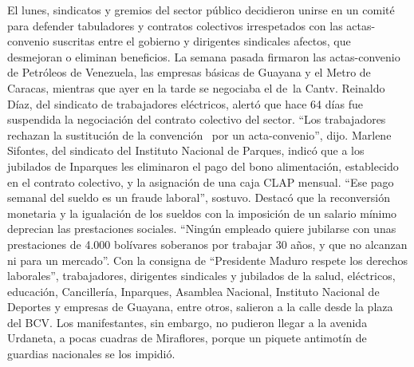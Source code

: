 \documentclass{article}%
\begin{document}
\newline%
%
El lunes, sindicatos y gremios del sector público decidieron unirse en un comité para defender tabuladores y contratos colectivos irrespetados con las actas{-}convenio suscritas entre el gobierno y dirigentes sindicales afectos, que desmejoran o eliminan beneficios.%
\newline%
%
La semana pasada firmaron las actas{-}convenio de Petróleos de Venezuela, las empresas básicas de Guayana y el Metro de Caracas, mientras que ayer en la tarde se negociaba el de~la Cantv.%
\newline%
%
Reinaldo Díaz, del sindicato de trabajadores eléctricos, alertó que hace 64 días fue suspendida la negociación del contrato colectivo del sector. “Los trabajadores rechazan la sustitución de la convención ~por un acta{-}convenio”, dijo.%
\newline%
%
Marlene Sifontes, del sindicato del Instituto Nacional de Parques, indicó que a los jubilados de Inparques les eliminaron el pago del bono alimentación, establecido en el contrato colectivo, y la asignación de una caja CLAP mensual. “Ese pago semanal del sueldo es un fraude laboral”, sostuvo.%
\newline%
%
Destacó que la reconversión monetaria y la igualación de los sueldos con la imposición de un salario mínimo deprecian las prestaciones sociales. “Ningún empleado quiere jubilarse con unas prestaciones de 4.000 bolívares soberanos por trabajar 30 años, y que no alcanzan ni para un mercado”.%
\newline%
%
Con la consigna de “Presidente Maduro respete los derechos laborales”, trabajadores, dirigentes sindicales y jubilados de la salud, eléctricos, educación, Cancillería, Inparques, Asamblea Nacional, Instituto Nacional de Deportes y empresas de Guayana, entre otros, salieron a la calle desde la plaza del BCV.%
\newline%
%
Los manifestantes, sin embargo, no pudieron llegar a la avenida Urdaneta, a pocas cuadras de Miraflores, porque un piquete antimotín de guardias nacionales se los impidió.%
\newline%
%
\end{document}
